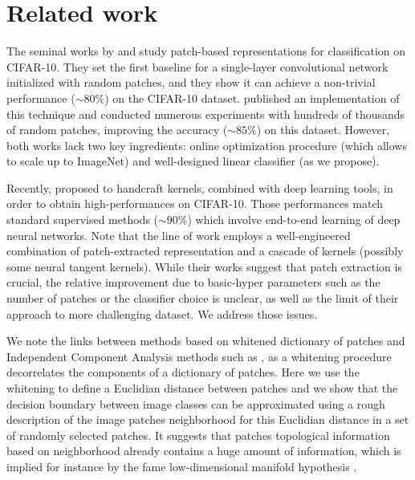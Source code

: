 \documentclass{article}
\begin{document}
\section{Related work}
\label{related_work}

The seminal works by \cite{coates2011analysis} and \cite{coates2011importance}  study patch-based representations for classification on CIFAR-10.
They set the first baseline for a single-layer convolutional network initialized with random patches, and they show it can achieve a non-trivial performance ($\sim 80 \%$) on the CIFAR-10 dataset. 
 \cite{recht2019imagenet} published an implementation of this technique and conducted numerous experiments with hundreds of thousands of random patches, improving the accuracy ($\sim 85 \%$) on this dataset.
However, both works lack two key ingredients: online optimization procedure  (which allows to scale up to ImageNet) and well-designed linear classifier (as we propose).

Recently, \citep{li2019enhanced,shankar2020neural} proposed to handcraft kernels, combined with deep learning tools, in order to obtain high-performances on CIFAR-10.
Those performances  match standard supervised methods ($\sim 90\%$) which involve end-to-end learning of deep neural networks.
Note that the line of work \citep{li2019enhanced,shankar2020neural,mairal2016end} employs a well-engineered combination of patch-extracted representation and a cascade of kernels (possibly some neural tangent kernels).
While their works suggest that patch extraction is crucial, the relative improvement due to basic-hyper parameters such as the number of patches or the classifier choice is unclear, as well as the limit of their approach to more challenging dataset.
We address those issues.

We  note the links between methods based on whitened dictionary of patches and Independent Component Analysis methods such as \citep{ngiam2010tiled}, as a whitening procedure decorrelates the components of a dictionary of patches.
Here we use the whitening to define a Euclidian distance between patches and we show that the decision boundary between image classes can be approximated using a rough description of the image patches neighborhood for this Euclidian distance in a set of randomly selected patches.
It suggests that patches topological information based on neighborhood already contains a huge amount of information, which is implied for instance by the fame low-dimensional manifold hypothesis 
\citep{fefferman2016testing}.
\end{document}
